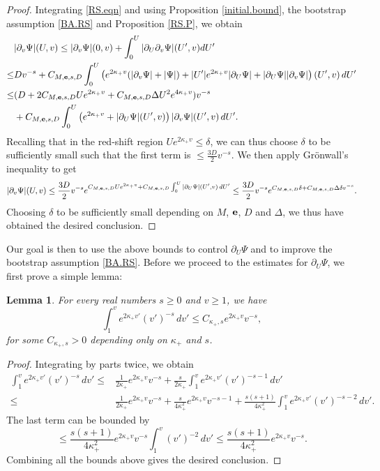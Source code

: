 \documentclass[10pt, reqno]{amsart}
\newtheorem{lemma}[theorem]{Lemma}
\theoremstyle{definition}
\theoremstyle{remark}
\numberwithin{equation}{section}
\newcommand{\rd}{\partial}
\newcommand{\0}{\emptyset}
\newcommand{\f}{\frac}
\newcommand{\de}{\delta}
\begin{document}
\begin{proof}
Integrating \eqref{RS.eqn} and using Proposition \ref{initial.bound}, the bootstrap assumption \eqref{BA.RS} and Proposition \ref{RS.P}, we obtain
\begin{equation*}
\begin{split}
&|\rd_v\Psi|(U,v)\leq |\rd_v\Psi|(0,v)+\int_0^U |\rd_U\rd_v\Psi|(U',v)dU'\\
\leq &D v^{-s}+C_{M,{\bf e},s,D}\int_0^U \left(e^{2\kappa_+ v}(|\rd_v\Psi|+|\Psi|)+ |U'|e^{2\kappa_+ v} |\rd_U\Psi|+|\rd_U\Psi||\rd_v\Psi|\right)(U',v)\, dU'\\
\leq & (D+2 C_{M,{\bf e},s,D} U e^{2\kappa_+ v}+C_{M,{\bf e},s,D}\Delta U^2 e^{4\kappa_+ v}) v^{-s}\\
&+C_{M,{\bf e},s,D}\int_0^U \left(e^{2\kappa_+ v}+|\rd_U\Psi|(U',v)\right)|\rd_v\Psi|(U',v)\, dU'.
\end{split}
\end{equation*}
Recalling that in the red-shift region $U e^{2\kappa_+ v}\leq \de$, we can thus choose $\de$ to be sufficiently small such that the first term is $\leq \f{3D}{2} v^{-s}$. We then apply Gr\"onwall's inequality to get
$$|\rd_v\Psi|(U,v)\leq \f{3D}2 v^{-s}e^{C_{M,{\bf e},s,D}Ue^{2\kappa_+ v}+C_{M,{\bf e},s,D}\int_0^U|\rd_U\Psi|(U',v)\, dU'}\leq \f{3D}2 v^{-s}e^{C_{M,{\bf e},s,D}\de+C_{M,{\bf e},s,D}\Delta\de v^{-s}}.$$
Choosing $\de$ to be sufficiently small depending on $M$, ${\bf e}$, $D$ and $\Delta$, we thus have obtained the desired conclusion.
\end{proof}
Our goal is then to use the above bounds to control $\rd_U\Psi$ and to improve the bootstrap assumption \eqref{BA.RS}. Before we proceed to the estimates for $\rd_U\Psi$, we first prove a simple lemma:
\begin{lemma}\label{lemma.1}
For every real numbers $s\geq 0$ and $v\geq 1$, we have
$$\int_1^v e^{2\kappa_+ v'} (v')^{-s} \,dv'\leq C_{\kappa_+,s}e^{2\kappa_+ v} v^{-s},$$
for some $C_{\kappa_+,s}>0$ depending only on $\kappa_+$ and $s$.
\end{lemma}
\begin{proof}
Integrating by parts twice, we obtain
\begin{equation*}
\begin{split}
\int_1^v e^{2\kappa_+ v'} (v')^{-s} \,dv'\leq &\f{1}{2\kappa_+}e^{2\kappa_+ v} v^{-s}+\f{s}{2\kappa_+}\int_1^v e^{2\kappa_+ v'} (v')^{-s-1} \,dv'\\
\leq &\f{1}{2\kappa_+}e^{2\kappa_+ v} v^{-s}+\f{s}{4\kappa_+^2}e^{2\kappa_+ v} v^{-s-1}+\f{s(s+1)}{4\kappa_+^2}\int_1^v e^{2\kappa_+ v'} (v')^{-s-2} \,dv'.
\end{split}
\end{equation*}
The last term can be bounded by
$$\leq \f{s(s+1)}{4\kappa_+^2}e^{2\kappa_+ v} v^{-s}\int_1^v (v')^{-2} \,dv'\leq \f{s(s+1)}{4\kappa_+^2}e^{2\kappa_+ v} v^{-s}.$$
Combining all the bounds above gives the desired conclusion.
\end{proof}
\end{document}
